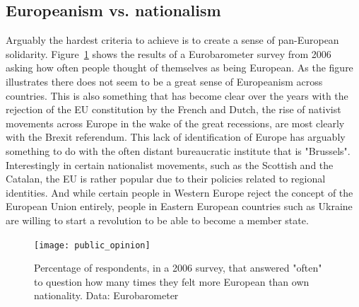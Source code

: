 \documentclass{tufte-handout}
\begin{document}
\subsection{Europeanism vs. nationalism}
Arguably the hardest criteria to achieve is to create a sense of pan-European solidarity. 
Figure~\ref{fig:public_opinion} shows the results of a Eurobarometer survey from 2006 asking how often people thought of themselves as being European. 
As the figure illustrates there does not seem to be a great sense of Europeanism across countries. 
This is also something that has become clear over the years with the rejection of the EU constitution by the French and Dutch, the rise of nativist movements across Europe in the wake of the great recessions, are most clearly with the Brexit referendum. 
This lack of identification of Europe has arguably something to do with the often distant bureaucratic institute that is "Brussels". 
Interestingly in certain nationalist movements, such as the Scottish and the Catalan, the EU is rather popular due to their policies related to regional identities. 
And while certain people in Western Europe reject the concept of the European Union entirely, people in Eastern European countries such as Ukraine are willing to start a revolution to be able to become a member state.

\begin{figure}
  \texttt{[image: public\_opinion]}
  \label{fig:public_opinion}
  \caption{Percentage of respondents, in a 2006 survey, that answered "often" to question how many times they felt more European than own nationality. Data: Eurobarometer}
\end{figure}

\end{document}
